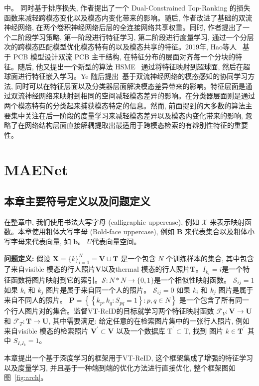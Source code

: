 中。 同时基于排序损失, 作者提出了一个 Dual-Constrained Top-Ranking 的损失函数来减轻跨模态变化以及模态内变化带来的影响。随后, 作者改进了基础的双流神经网络, 在两个卷积神经网络后层的全连接网络共享权重。同时, 作者提出了一个二阶段学习策略, 第一阶段进行特征学习, 第二阶段进行度量学习, 通过一个分层次的跨模态匹配模型优化模态特有的以及模态共享的特征。2019年, Hao等人~\cite{hao2019dual} 基于 PCB 模型设计双流 PCB 主干结构, 在特征分布的层面对齐每一个分块的特征。随后, 他又提出一个新型的算法 HSME~\cite{hao2019hsme} 通过将特征映射到超球面, 然后在超球面进行特征嵌入学习。Ye 随后提出~\cite{ye2019modality}基于双流神经网络的模态感知的协同学习方法, 同时可以在特征层面以及分类器层面解决模态差异带来的影响。特征层面是通过双流神经网络来映射到相同的空间减轻模态差异的影响。在分类器层面则是通过两个模态特有的分类起来捕获模态特定的信息。然而, 前面提到的大多数的算法主要集中关注在后一阶段的度量学习来减轻模态差异以及模态内变化带来的影响, 忽略了在网络结构层面直接解耦提取出最适用于跨模态检索的有辨别性特征的重要性。

\section{MAENet}
\subsection{本章主要符号定义以及问题定义}
在整章中, 我们使用书法大写字母 (calligraphic uppercase), 例如 $\mathcal{X}$ 来表示映射函数。本章使用粗体大写字母 (Bold-face uppercase), 例如 $\mathbf{B}$ 来代表集合以及粗体小写字母来代表向量, 如 $\mathbf{b}$。 $U$代表向量空间。 \par
\textbf{问题定义:} 假设 $\mathbf{X}=\{k\}_{i=1}^N=\mathbf{V} \cup \mathbf{T}$ 是一个包含 $N$ 个训练样本的集合, 其中包含了来自visible 模态的行人照片$\mathbf{V}$以及thermal 模态的行人照片$\mathbf{T}$。$I_{k_i} = i$是一个特征函数将图片映射到它的索引。$\mathcal{S}: N * N \rightarrow\{0,1\}$是一个相似性映射函数。 $\mathcal{S}_{ij} = 1$ 如果 $k_i$ 和 $ k_j$ 图片是属于来自同一个人的照片。  $\mathcal{S}_{ij} = 0$ 如果 $k_i$ 和 $ k_j$ 图片是属于来自不同人的照片。 $\mathbf{P}=\left\{\left\{k_p, k_q: S_{p q}=1\right\}: p, q \in N\right\}$ 是一个包含了所有同一个行人图片对的集合。监督VT-ReID的目标就学习两个特征映射函数 $\mathcal{F}_V: \mathbf{V} \rightarrow \mathbf{U}$ 和 $\mathcal{F}_T: \mathbf{T} \rightarrow \mathbf{U}$, 其中需要满足: 给定任意的在检索图片集中的一张行人照片, 例如来自visible 模态的检索照片 $\mathbf{V}^{\prime} \subset \mathbf{V}$ 以及一个数据库 $\mathrm{T}^{\prime} \subset \mathrm{T}$, 找到 图片 $k \in \mathbf{T}^{\prime}$ 其中 $S_{I_v I_k}=1$。\par
本章提出一个基于深度学习的框架用于VT-ReID, 这个框架集成了增强的特征学习以及度量学习, 并且基于一种端到端的优化方法进行直接优化, 整个框架图如图~\ref{fig:arch}。
